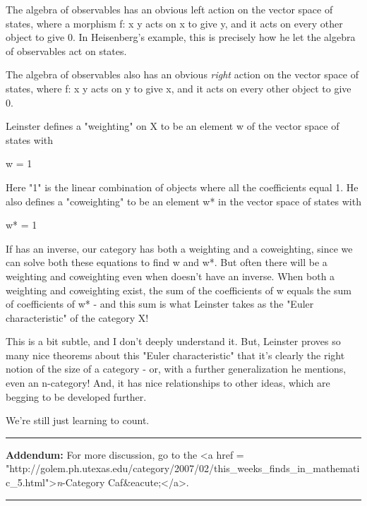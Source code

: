 The algebra of observables has an obvious left action on the vector 
space of states, where a morphism f: x \to  y acts on x to give y, and 
it acts on every other object to give 0.  In Heisenberg's example, 
this is precisely how he let the algebra of observables act on states.

The algebra of observables also has an obvious \emph{right} action
on the vector space of states, where f: x \to  y acts on y to give
x, and it acts on every other object to give 0.

Leinster defines a "weighting" on X to be an element w of
the vector space of states with

\zeta  w = 1

Here "1" is the linear combination of objects where all the
coefficients equal 1.  He also defines a "coweighting" to be
an element w* in the vector space of states with

w* \zeta  = 1

If \zeta  has an inverse, our category has both a weighting and a
coweighting, since we can solve both these equations to find w and w*.
But often there will be a weighting and coweighting even when \zeta 
doesn't have an inverse.  When both a weighting and coweighting exist,
the sum of the coefficients of w equals the sum of coefficients of w*
- and this sum is what Leinster takes as the "Euler
characteristic" of the category X!

This is a bit subtle, and I don't deeply understand it.  But, Leinster
proves so many nice theorems about this "Euler characteristic" that 
it's clearly the right notion of the size of a category - or, with a
further generalization he mentions, even an n-category!  And, it has 
nice relationships to other ideas, which are begging to be developed
further.

We're still just learning to count.

\par\noindent\rule{\textwidth}{0.4pt}
\textbf{Addendum:} For more discussion, go to the <a href = "http://golem.ph.utexas.edu/category/2007/02/this_weeks_finds_in_mathematic_5.html">\emph{n}-Category
Caf&eacute;</a>.





\par\noindent\rule{\textwidth}{0.4pt}
